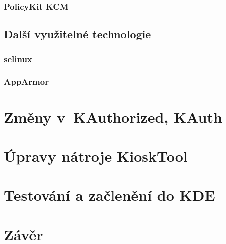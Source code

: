 \subsection{PolicyKit KCM}
\section{Další využitelné technologie}
\subsection{selinux}
\subsection{AppArmor}
\chapter{Změny v~KAuthorized, KAuth}
\chapter{Úpravy nátroje KioskTool}
\chapter{Testování a začlenění do KDE}
\chapter{Závěr}
\cite{fitWeb}
